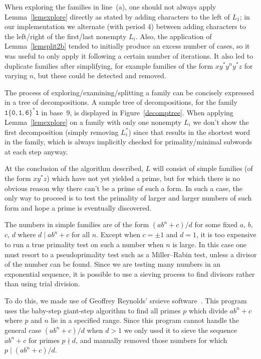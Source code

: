 \documentclass[12pt]{article}
\theoremstyle{plain}
\theoremstyle{definition}
\theoremstyle{remark}
\newcommand{\0}{\mathtt{0}}
\newcommand{\1}{\mathtt{1}}
\newcommand{\2}{\mathtt{2}}
\newcommand{\3}{\mathtt{3}}
\newcommand{\4}{\mathtt{4}}
\newcommand{\5}{\mathtt{5}}
\newcommand{\6}{\mathtt{6}}
\newcommand{\7}{\mathtt{7}}
\newcommand{\8}{\mathtt{8}}
\newcommand{\9}{\mathtt{9}}
\begin{document}
When exploring the families in line~(a), one should not always apply Lemma~\ref{lemexplore} directly as stated by adding
characters to the left of $L_1$; in our implementation we alternate (with period 4) between adding characters
to the left/right of the first/last nonempty $L_i$.  Also, the application of Lemma~\ref{lemsplit2b} tended to initially
produce an excess number of cases, so it was useful to only apply it following a certain number of iterations.  It also led to
duplicate families after simplifying, for example families of the form $xy^*y^ny^*z$ for varying $n$,
but these could be detected and removed.

The process of exploring/examining/splitting a family can be concisely expressed in a tree of decompositions.
A sample tree of decompositions, for the family $\1\{\0,\1,\6\}^*\1$ in base~9, is displayed in Figure~\ref{decomptree}.
When applying Lemma~\ref{lemexplore} on a family with only one nonempty $L_i$ we don't show the first decomposition
(simply removing $L_i^*$) since that results in the shortest word in the family, which is always implicitly
checked for primality/minimal subwords at each step anyway.

At the conclusion of the algorithm described, $L$ will consist of simple families (of the form $xy^*z$) which have not yet
yielded a prime, but for which there is no obvious reason why there can't be a prime of such a form.
In such a case, the only way to proceed is to test the primality of larger and larger numbers of such form and hope
a prime is eventually discovered.

The numbers in simple families are of the form $(ab^n+c)/d$ for some fixed $a$, $b$, $c$, $d$ where $d\mid ab^n+c$ for all $n$.
Except when $c=\pm1$ and $d=1$, it is too expensive to run a true primality test on such a number when $n$ is large.
In this case one must resort to a pseudoprimality test such as a Miller--Rabin test, unless a divisor of the number can be found.
Since we are testing many numbers in an exponential sequence, it is possible to use a sieving process to find divisors
rather than using trial division.

To do this, we made use of Geoffrey Reynolds' srsieve software~\cite{srsieve}.  This program uses the baby-step giant-step
algorithm to find all primes $p$ which divide $ab^n+c$ where $p$ and $n$ lie in a specified range.  Since this program cannot
handle the general case $(ab^n+c)/d$ when $d>1$ we only used it to sieve the sequence $ab^n+c$ for primes $p\nmid d$, and manually
removed those numbers for which $p\mid(ab^n+c)/d$.
\end{document}
